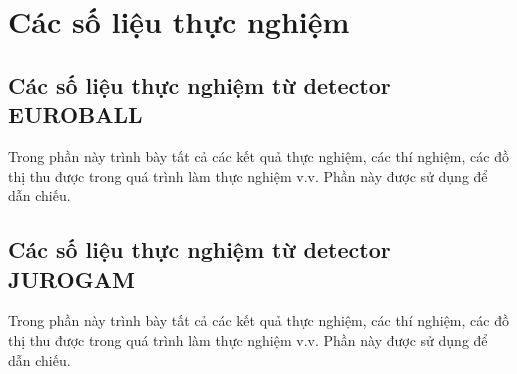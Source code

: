 \chapter{Các số liệu thực nghiệm}
\label{phuluc:solieuthucnghiem}

\section{Các số liệu thực nghiệm từ detector EUROBALL} 
Trong phần này trình bày tất cả các kết quả thực nghiệm, các thí nghiệm, các đồ thị thu được trong quá trình làm thực nghiệm v.v. Phần này được sử dụng để dẫn chiếu.

\section{Các số liệu thực nghiệm từ detector JUROGAM}
Trong phần này trình bày tất cả các kết quả thực nghiệm, các thí nghiệm, các đồ thị thu được trong quá trình làm thực nghiệm v.v. Phần này được sử dụng để dẫn chiếu.


